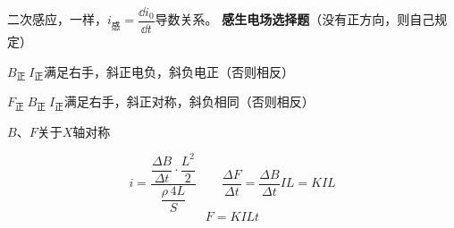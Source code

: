 二次感应，一样，$i_{\text{感}}=\dfrac{\dd i_{0}}{\dd t}$\quad 导数关系。 %
\textbf{感生电场选择题}（没有正方向，则自己规定）

$B_{\text{正}}\ I_{\text{正}}$\quad 满足右手，斜正电负，斜负电正（否则相反）

$F_{\text{正}}\ B_{\text{正}}\ I_{\text{正}}$\quad 满足右手，斜正对称，斜负相同（否则相反）

$B$、$F$关于$X$轴对称

\[ i=\dfrac{\dfrac{\Delta B}{\Delta t}\cdot\dfrac{L^{2}}{2}}{\dfrac{\rho\,4L}{S}}\qquad
\dfrac{\Delta F}{\Delta t}=\dfrac{\Delta B}{\Delta t}IL=KIL \]
\[ F=KILt \]
